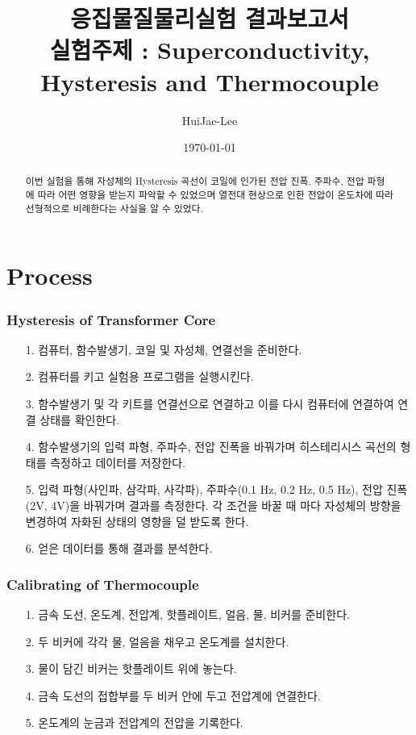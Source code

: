 \documentclass[aps,reprint,superscriptaddress,10pt]{revtex4-2}
\begin{document}
\title{응집물질물리실험 결과보고서 \\
\small 실험주제 : Superconductivity, Hysteresis and Thermocouple}

\author{HuiJae-Lee}

\date{\today}

\begin{abstract}
  이번 실험을 통해 자성체의 Hysteresis 곡선이 코일에 인가된 전압 진폭, 주파수, 
  전압 파형에 따라 어떤 영향을 받는지 파악할 수 있었으며 열전대 현상으로 인한
  전압이 온도차에 따라 선형적으로 비례한다는 사실을 알 수 있었다.
  \end{abstract}

 \maketitle
 
 \section{Process}
 \subsubsection{Hysteresis of Transformer Core}
\begin{itemize}
  \item[1. ] 컴퓨터, 함수발생기, 코일 및 자성체, 연결선을 준비한다.
  \item[2. ] 컴퓨터를 키고 실험용 프로그램을 실행시킨다.
  \item[3. ] 함수발생기 및 각 키트를 연결선으로 연결하고 이를 다시 컴퓨터에 연결하여
  연결 상태를 확인한다.
  \item[4. ] 함수발생기의 입력 파형, 주파수, 전압 진폭을 바꿔가며 히스테리시스 곡선의
  형태를 측정하고 데이터를 저장한다.
  \item[5. ] 입력 파형(사인파, 삼각파, 사각파), 주파수(0.1 Hz, 0.2 Hz, 0.5 Hz), 
  전압 진폭(2V, 4V)을 바꿔가며 결과를 측정한다. 각 조건을 바꿀 때 마다
  자성체의 방향을 변경하여 자화된 상태의 영향을 덜 받도록 한다.
  \item[6. ] 얻은 데이터를 통해 결과를 분석한다.
\end{itemize}
\subsubsection{Calibrating of Thermocouple}
\begin{itemize}
  \item[1. ] 금속 도선, 온도계, 전압계, 핫플레이트, 얼음, 물, 비커를 준비한다.
  \item[2. ] 두 비커에 각각 물, 얼음을 채우고 온도계를 설치한다.
  \item[3. ] 물이 담긴 비커는 핫플레이트 위에 놓는다.
  \item[4. ] 금속 도선의 접합부를 두 비커 안에 두고 전압계에 연결한다.
  \item[5. ] 온도계의 눈금과 전압계의 전압을 기록한다.   
\end{itemize}
\end{document}
